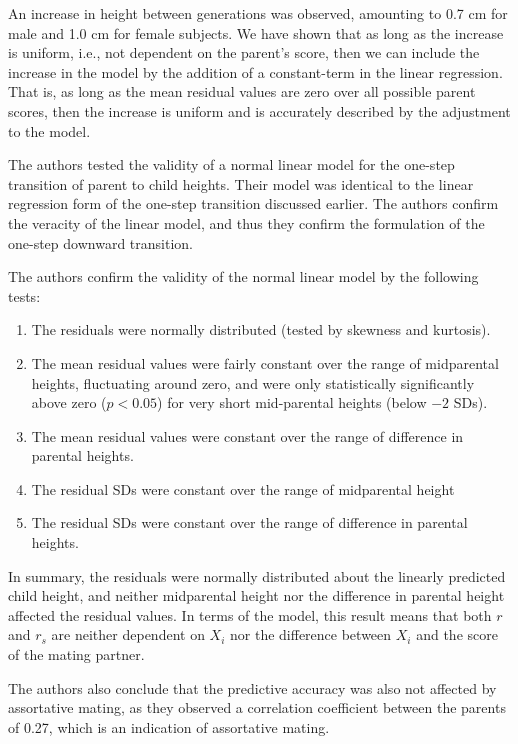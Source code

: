 \documentclass[a4paper,11pt]{article} %
\begin{document}
An increase in height between generations was observed, amounting to 0.7 cm for male and 1.0 cm for female subjects. We have shown that as long as the increase is uniform, i.e., not dependent on the parent's score, then we can include the increase in the model by the addition of a constant-term in the linear regression. That is, as long as the mean residual values are zero over all possible parent scores, then the increase is uniform and is accurately described by the adjustment to the model.

The authors tested the validity of a normal linear model for the one-step transition of parent to child heights. Their model was identical to the linear regression form of the one-step transition discussed earlier. The authors confirm the veracity of the linear model, and thus they confirm the formulation of the one-step downward transition.

The authors confirm the validity of the normal linear model by the following tests:
\begin{enumerate}
\item The residuals were normally distributed (tested by skewness and kurtosis).
\item The mean residual values were fairly constant over the range of midparental heights, fluctuating around zero, and were only statistically significantly above zero ($p < 0.05$) for very short mid-parental heights (below $-2$ SDs).
\item The mean residual values were constant over the range of difference in parental heights.
\item The residual SDs were constant over the range of midparental height  
\item The residual SDs were constant over the range of difference in parental heights.
\end{enumerate}

In summary, the residuals were normally distributed about the linearly predicted child height, and neither midparental height nor the difference in parental height affected the residual values. In terms of the model, this result means that both $r$ and $r_s$ are neither dependent on $X_i$ nor the difference between $X_i$ and the score of the mating partner. 

The authors also conclude that the predictive accuracy was also not affected by assortative mating, as they observed a correlation coefficient between the parents of 0.27, which is an indication of assortative mating.
\end{document}
